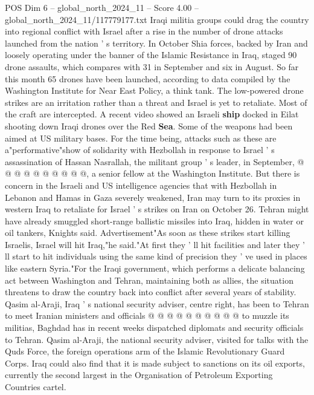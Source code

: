 \begin{textsample}{POS Dim 6 – global\_north\_2024\_11 – Score 4.00 – global\_north\_2024\_11/117779177.txt}  \label{ex:f6_pos_288}
Iraqi militia groups could drag the country into regional conflict with Israel after a rise in the number of drone attacks launched from the nation ' s territory.
In October Shia forces, backed by Iran and loosely operating under the banner of the Islamic Resistance in Iraq, staged 90 drone assaults, which compares with 31 in September and six in August.
So far this month 65 drones have been launched, according to data compiled by the Washington Institute for Near East Policy, a think tank.
The low-powered drone strikes are an irritation rather than a threat and Israel is yet to retaliate.
Most of the craft are intercepted.
A recent video showed an Israeli \textbf{ship} docked in Eilat shooting down Iraqi drones over the Red \textbf{Sea}.
Some of the weapons had been aimed at US military bases.
For the time being, attacks such as these are a"performative"show of solidarity with Hezbollah in response to Israel ' s assassination of Hassan Nasrallah, the militant group ' s leader, in September, @ @ @ @ @ @ @ @ @ @, a senior fellow at the Washington Institute.
But there is concern in the Israeli and US intelligence agencies that with Hezbollah in Lebanon and Hamas in Gaza severely weakened, Iran may turn to its proxies in western Iraq to retaliate for Israel ' s strikes on Iran on October 26.
Tehran might have already smuggled short-range ballistic missiles into Iraq, hidden in water or oil tankers, Knights said.
Advertisement"As soon as these strikes start killing Israelis, Israel will hit Iraq,"he said."At first they ' ll hit facilities and later they ' ll start to hit individuals using the same kind of precision they ' ve used in places like eastern Syria."For the Iraqi government, which performs a delicate balancing act between Washington and Tehran, maintaining both as allies, the situation threatens to draw the country back into conflict after several years of stability.
Qasim al-Araji, Iraq ' s national security adviser, centre right, has been to Tehran to meet Iranian ministers and officials @ @ @ @ @ @ @ @ @ @ to muzzle its militias, Baghdad has in recent weeks dispatched diplomats and security officials to Tehran.
Qasim al-Araji, the national security adviser, visited for talks with the Quds Force, the foreign operations arm of the Islamic Revolutionary Guard Corps.
Iraq could also find that it is made subject to sanctions on its oil exports, currently the second largest in the Organisation of Petroleum Exporting Countries cartel.

\end{textsample}
